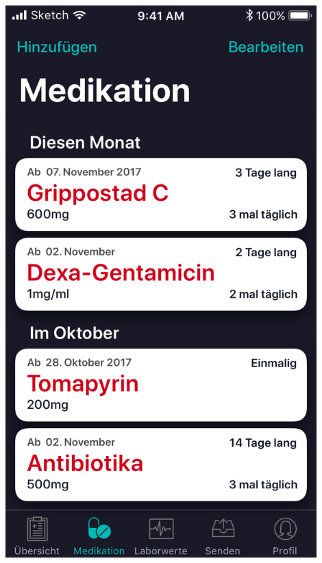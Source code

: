 \documentclass[a4paper]{scrreprt}
\begin{document}
\begin{minipage}[t][][b]{0.4\textwidth}

\includegraphics[width=0.9\textwidth]{mockups/MedTab}
~\\

\end{minipage}
\end{document}
